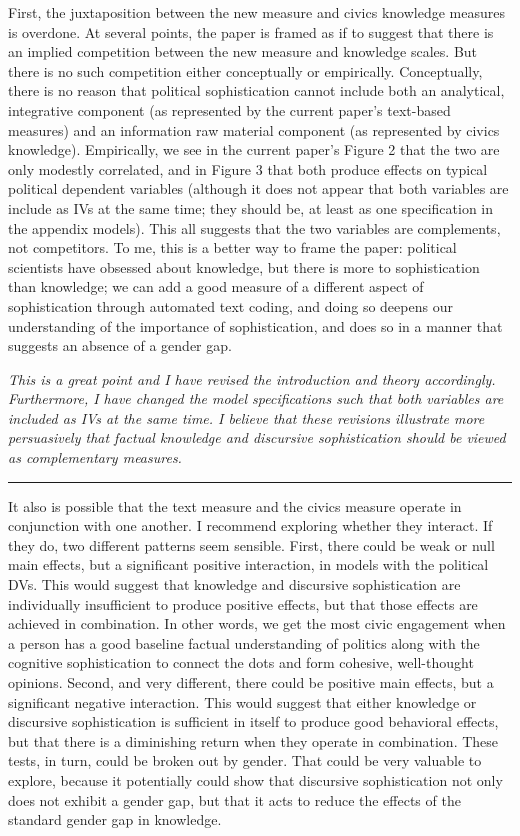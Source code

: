 First, the juxtaposition between the new measure and civics knowledge measures is overdone. At several points, the paper is framed as if to suggest that there is an implied competition between the new measure and knowledge scales. But there is no such competition either conceptually or empirically. Conceptually, there is no reason that political sophistication cannot include both an analytical, integrative component (as represented by the current paper's text-based measures) and an information raw material component (as represented by civics knowledge). Empirically, we see in the current paper's Figure 2 that the two are only modestly correlated, and in Figure 3 that both produce effects on typical political dependent variables (although it does not appear that both variables are include as IVs at the same time; they should be, at least as one specification in the appendix models). This all suggests that the two variables are complements, not competitors. To me, this is a better way to frame the paper: political scientists have obsessed about knowledge, but there is more to sophistication than knowledge; we can add a good measure of a different aspect of sophistication through automated text coding, and doing so deepens our understanding of the importance of sophistication, and does so in a manner that suggests an absence of a gender gap. 

\textit{This is a great point and I have revised the introduction and theory accordingly. Furthermore, I have changed the model specifications such that both variables are included as IVs at the same time. I believe that these revisions illustrate more persuasively that factual knowledge and discursive sophistication should be viewed as complementary measures.}

\rule{\linewidth}{.01cm}

It also is possible that the text measure and the civics measure operate in conjunction with one another. I recommend exploring whether they interact. If they do, two different patterns seem sensible. First, there could be weak or null main effects, but a significant positive interaction, in models with the political DVs. This would suggest that knowledge and discursive sophistication are individually insufficient to produce positive effects, but that those effects are achieved in combination. In other words, we get the most civic engagement when a person has a good baseline factual understanding of politics along with the cognitive sophistication to connect the dots and form cohesive, well-thought opinions. Second, and very different, there could be positive main effects, but a significant negative interaction. This would suggest that either knowledge or discursive sophistication is sufficient in itself to produce good behavioral effects, but that there is a diminishing
return when they operate in combination. These tests, in turn, could be broken out by gender. That could be very valuable to explore, because it potentially could show that discursive sophistication not only does not exhibit a gender gap, but that it acts to reduce the effects of the standard gender gap in knowledge.


